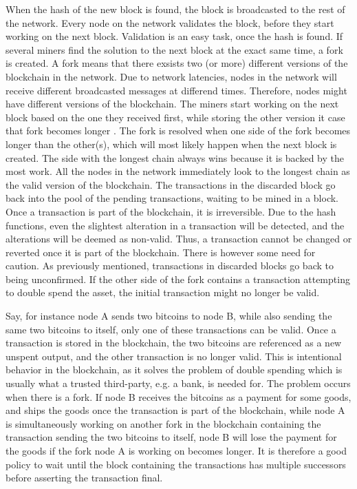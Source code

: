 When the hash of the new block is found, the block is broadcasted to the rest of the network. Every node on the network validates the block, before they start working on the next block. Validation is an easy task, once the hash is found. If several miners find the solution to the next block at the exact same time, a fork is created. 
A fork means that there exsists two (or more) different versions of the blockchain in the network. Due to network latencies, nodes in the network will receive different broadcasted messages at differend times. Therefore, nodes might have different versions of the blockchain. The miners start working on the next block based on the one they received first, while storing the other version it case that fork becomes longer \cite{Nakamoto_bitcoin}. The fork is resolved when one side of the fork becomes longer than the other(s), which will most likely happen when the next block is created. The side with the longest chain always wins because it is backed by the most work. All the nodes in the network immediately look to the longest chain as the valid version of the blockchain. The transactions in the discarded block go back into the pool of the pending transactions, waiting to be mined in a block. Once a transaction is part of the blockchain, it is irreversible. Due to the hash functions, even the slightest alteration in a transaction will be detected, and the alterations will be deemed as non-valid. Thus, a transaction cannot be changed or reverted once it is part of the blockchain. There is however some need for caution. As previously mentioned, transactions in discarded blocks go back to being unconfirmed. If the other side of the fork contains a transaction attempting to double spend the asset, the initial transaction might no longer be valid. 

Say, for instance node A sends two bitcoins to node B, while also sending the same two bitcoins to itself, only one of these transactions can be valid. Once a transaction is stored in the blockchain, the two bitcoins are referenced as a new unspent output, and the other transaction is no longer valid. This is intentional behavior in the blockchain, as it solves the problem of double spending which is usually what a trusted third-party, e.g. a bank, is needed for. The problem occurs when there is a fork. If node B receives the bitcoins as a payment for some goods, and ships the goods once the transaction is part of the blockchain, while node A is simultaneously working on another fork in the blockchain containing the transaction sending the two bitcoins to itself, node B will lose the payment for the goods if the fork node A is working on becomes longer. It is therefore a good policy to wait until the block containing the transactions has multiple successors before asserting the transaction final.


